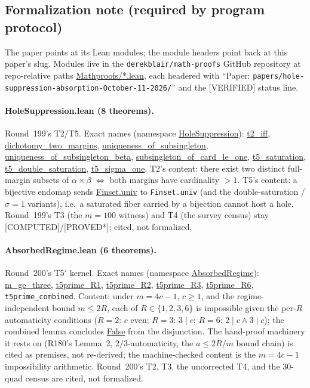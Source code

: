 \documentclass[11pt,a4paper]{article}
\theoremstyle{definition}
\begin{document}
\subsection{Formalization note (required by program protocol)}

The paper points at its Lean modules; the module headers point back at
this paper's slug. Modules live in the \texttt{derekblair/math-proofs}
GitHub repository at repo-relative paths \url{Mathproofs/*.lean},
each headered with ``Paper:
\texttt{papers/hole-suppression-absorption-October-11-2026/}'' and the
[VERIFIED] status line.

\paragraph{HoleSuppression.lean (8 theorems).} Round~199's T2/T5.
Exact names (namespace \url{HoleSuppression}):
\url{t2_iff}, \url{dichotomy_two_margins},
\url{uniqueness_of_subsingleton},
\url{uniqueness_of_subsingleton_beta},
\url{subsingleton_of_card_le_one}, \url{t5_saturation},
\url{t5_double_saturation}, \url{t5_sigma_one}.
T2's content: there exist two distinct full-margin subsets of
$\alpha\times\beta$ $\iff$ both margins have cardinality $>1$.
T5's content: a bijective endomap sends \url{Finset.univ} to
\texttt{Finset.univ} (and the double-saturation / $\sigma=1$
variants), i.e.\ a saturated fiber carried by a bijection cannot
host a hole. Round~199's T3 (the $m=100$ witness) and T4 (the survey
census) stay [COMPUTED]/[PROVED*]; cited, not formalized.

\paragraph{AbsorbedRegime.lean (6 theorems).} Round~200's T5$'$
kernel. Exact names (namespace \url{AbsorbedRegime}):
\url{m_ge_three}, \url{t5prime_R1}, \url{t5prime_R2},
\url{t5prime_R3}, \url{t5prime_R6},
\texttt{t5prime\_combined}. Content: under $m=4c-1$, $c\ge1$, and the
regime-independent bound $m\le2R$, each of $R\in\{1,2,3,6\}$ is
impossible given the per-$R$ automaticity conditions
($R=2$: $c$ even; $R=3$: $3\mid c$; $R=6$: $2\mid c\land3\mid c$);
the combined lemma concludes \url{False} from the disjunction.
The hand-proof machinery it rests on (R180's Lemma~2, $2/3$-automaticity,
the $a\le2R/m$ bound chain) is cited as premises, not re-derived;
the machine-checked content is the $m=4c-1$ impossibility arithmetic.
Round~200's T2, T3, the uncorrected T4, and the 30-quad census are
cited, not formalized.
\end{document}
